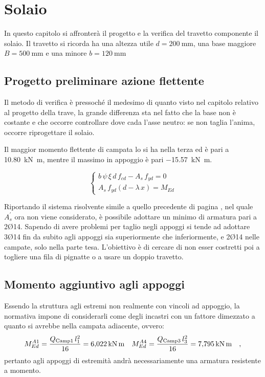 \chapter{Solaio}
In questo capitolo si affronterà il progetto e la verifica del travetto componente il solaio.
Il travetto si ricorda ha una altezza utile $d=\SI{200}{\milli\metre}$, una base maggiore $B=\SI{500}{\milli\metre}$ e una minore $b=\SI{120}{\milli\metre}$

\section{Progetto preliminare azione flettente}
Il metodo di verifica è pressoché il medesimo di quanto visto nel capitolo relativo al progetto della trave, la grande differenza sta nel fatto che la base non è costante e che occorre controllare dove cada l'asse neutro: se non taglia l'anima, occorre riprogettare il solaio.

Il maggior momento flettente di campata lo si ha nella terza ed è pari a \SI{10.80}{\kilo\newton\metre}, mentre il massimo in appoggio è pari \SI{-15.57}{\kilo\newton\metre}.

\begin{equation}
    \begin{cases}
      b \, \psi \, \xi \, d \, f_{cd} - A_s \, f_{yd} = 0 \\
      A_s \, f_{yd} \left(d - \lambda\,x\right) = M_{Ed}
    \end{cases}
  \end{equation}

Riportando il sistema risolvente simile a quello precedente di pagina \pageref{eq:sistemaSLU}, nel quale $A_s^\prime$ ora non viene considerato, è possibile adottare un minimo di armatura pari a 2Ø14. 
Sapendo di avere problemi per taglio negli appoggi si tende ad adottare 3Ø14 fin da subito agli appoggi sia superiormente che inferiormente, e 2Ø14 nelle campate, solo nella parte tesa. 
L'obiettivo è di cercare di non esser costretti poi a togliere una fila di pignatte o a usare un doppio travetto.

\section{Momento aggiuntivo agli appoggi}
Essendo la struttura agli estremi non realmente con vincoli ad appoggio, la normativa impone di considerarli come degli incastri con un fattore dimezzato a quanto si avrebbe nella campata adiacente, ovvero:
\[
    M_{Ed}^{A1} = \frac{Q_\textup{Camp1} \, l_1^2 }{16} =  \SI{6.022}{\kilo\newton\metre} \quad M_{Ed}^{A4} = \frac{Q_\textup{Camp3} \, l_3^2 }{16} =  \SI{7.795}{\kilo\newton\metre} \quad ,
\]
pertanto agli appoggi di estremità andrà necessariamente una armatura resistente a momento.

